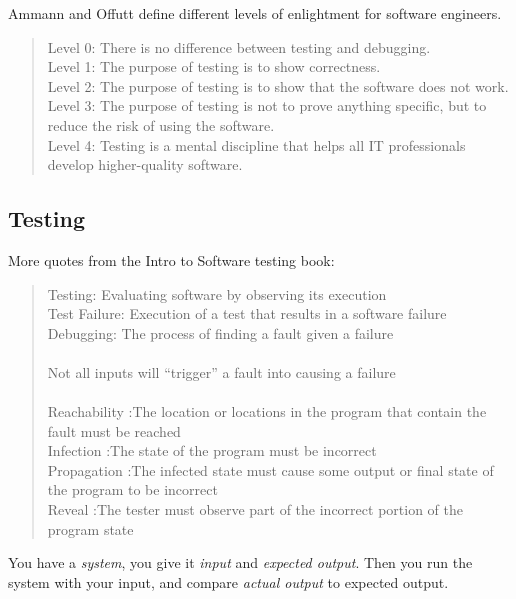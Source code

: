 Ammann and Offutt 
define different levels of enlightment for software engineers.

\begin{quote}
Level 0:  There is no difference between testing and debugging. \\
Level 1: The purpose of testing is to show correctness. \\
Level 2: The purpose of testing is to show that the software does not work. \\
Level 3: The purpose of testing is not to prove anything specific, but to reduce the risk of using the software. \\
Level 4: Testing is a mental discipline that helps all IT professionals develop higher-quality software.
\end{quote}



\subsection{Testing}

More quotes from the Intro to Software testing book:

\begin{quote}
Testing: Evaluating software by observing its execution \\
Test Failure: Execution of a test that results in a software failure \\
Debugging: The process of finding a fault given a failure \\
\\
Not all inputs will “trigger” a fault into causing a failure
\\
\\
Reachability :The location or locations in the program that contain the fault must be reached \\
Infection :The state of the program must be incorrect \\
Propagation :The infected state must cause some output or  final state of the program to be incorrect \\
Reveal :The tester must observe part of the incorrect portion of the program state \\
\end{quote}

You have a \emph{system}, you give it \emph{input} and 
\emph{expected output}.
Then you run the system with your input, and compare \emph{actual
  output} to expected output.

